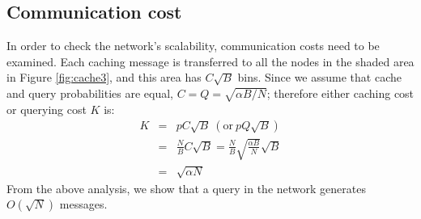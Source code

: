 \documentclass[conference]{IEEEtran}
\begin{document}
\subsection{Communication cost}
In order to check the network's scalability, communication costs
need to be examined. Each caching message is transferred to all the
nodes in the shaded area in Figure \ref{fig:cache3}, and this area has
$C\sqrt{B}$ bins. Since we assume that cache and query probabilities are
equal, $C = Q = \sqrt{\alpha B/N}$; therefore either caching cost or querying cost $K$ is:
\begin{eqnarray*}\label{th}
K &=& pC\sqrt{B} \  (\mathrm{or}\  pQ\sqrt{B})\\
  &=& \frac{N}{B}C\sqrt{B} = \frac{N}{B}\sqrt{\frac{\alpha B}{N}}\sqrt{B}\\
  &=& \sqrt{\alpha N}
\end{eqnarray*}
From the above analysis, we show that a query in the network
generates $O(\sqrt{N})$ messages.
\end{document}
